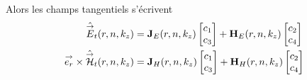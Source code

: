  \begin{prop}
    Alors les champs tangentiels s'écrivent
    \begin{subequations}
      \begin{align}
        \hat {{\overset{\rightarrow}{E}}}_t(r,n,k_z) &= \mathbf{J}_{E}(r,n,k_z)
        \begin{bmatrix}
          c_1 \\
          c_3
        \end{bmatrix}
        +
        \mathbf{H}_{E}(r,n,k_z)
        \begin{bmatrix}
          c_2 \\
          c_4
        \end{bmatrix}
        \label{eq:imp_fourier:cylindre:Et}\\
        {\overset{\rightarrow}{e_r}}\times\hat {{\overset{\rightarrow}{\mathcal{H}}}}_t(r,n,k_z) &=
        \mathbf{J}_{H}(r,n,k_z)
        \begin{bmatrix}
          c_1 \\
          c_3
        \end{bmatrix}
        +
        \mathbf{H}_{H}(r,n,k_z)
        \begin{bmatrix}
          c_2 \\
          c_4
        \end{bmatrix}
        \label{eq:imp_fourier:cylindre:Ht}
      \end{align}
    \end{subequations}
  \end{prop}



